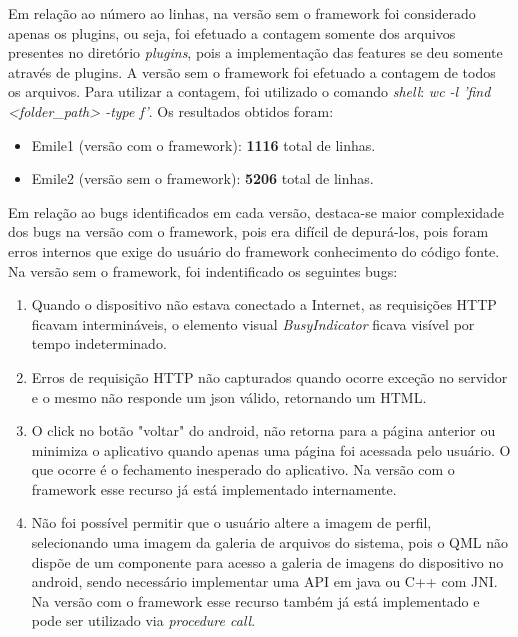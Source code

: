 Em relação ao número ao linhas, na versão sem o framework foi considerado apenas os plugins, ou seja, foi efetuado a contagem somente dos arquivos presentes no diretório \textit{plugins}, pois a implementação das features se deu somente através de plugins. A versão sem o framework foi efetuado a contagem de todos os arquivos. Para utilizar a contagem, foi utilizado o comando \textit{shell}: \textit{wc -l 'find <folder\_path> -type f'}. Os resultados obtidos foram:

\begin{itemize}
	\item Emile1 (versão com o framework): \textbf{1116} total de linhas.
	\item Emile2 (versão sem o framework): \textbf{5206} total de linhas.
\end{itemize}

Em relação ao bugs identificados em cada versão, destaca-se maior complexidade dos bugs na versão com o framework, pois era difícil de depurá-los, pois foram erros internos que exige do usuário do framework conhecimento do código fonte. Na versão sem o framework, foi indentificado os seguintes bugs:

\begin{enumerate}
	\item  Quando o dispositivo não estava conectado a Internet, as requisições HTTP ficavam intermináveis, o elemento visual \textit{BusyIndicator} ficava visível por tempo indeterminado.

	\item Erros de requisição HTTP não capturados quando ocorre exceção no servidor e o mesmo não responde um json válido, retornando um HTML.

	\item O click no botão "voltar" do android, não retorna para a página anterior ou minimiza o aplicativo quando apenas uma página foi acessada pelo usuário. O que ocorre é o fechamento inesperado do aplicativo. Na versão com o framework esse recurso já está implementado internamente.

	\item Não foi possível permitir que o usuário altere a imagem de perfil, selecionando uma imagem da galeria de arquivos do sistema, pois o QML não dispõe de um componente para acesso a galeria de imagens do dispositivo no android, sendo necessário implementar uma API em java ou C++ com JNI. Na versão com o framework esse recurso também já está implementado e pode ser utilizado via \textit{procedure call}.
\end{enumerate}

